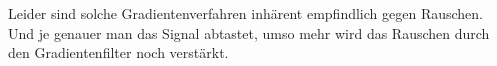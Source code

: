 \begin{example}
\begin{description}

  Leider sind solche Gradientenverfahren inhärent empfindlich gegen Rauschen. Und je genauer man 
  das Signal abtastet, umso mehr wird das Rauschen durch den Gradientenfilter noch verstärkt.
\end{description}
\end{example}